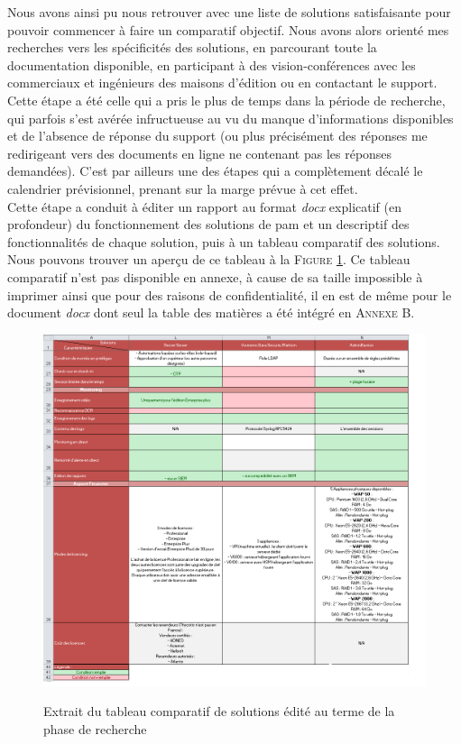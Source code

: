 Nous avons ainsi pu nous retrouver avec une liste de solutions satisfaisante pour pouvoir commencer à faire un comparatif objectif. Nous avons alors orienté mes recherches vers les spécificités des solutions, en parcourant toute la documentation disponible, en participant à des vision-conférences avec les commerciaux et ingénieurs des maisons d'édition ou en contactant le support. Cette étape a été celle qui a pris le plus de temps dans la période de recherche, qui parfois s'est avérée infructueuse au vu du manque d'informations disponibles et de l'absence de réponse du support (ou plus précisément des réponses me redirigeant vers des documents en ligne ne contenant pas les réponses demandées). C'est par ailleurs une des étapes qui a complètement décalé le calendrier prévisionnel, prenant sur la marge prévue à cet effet.\\
Cette étape a conduit à éditer un rapport au format \emph{docx} explicatif (en profondeur) du fonctionnement des solutions de \gls{pam} et un descriptif des fonctionnalités de chaque solution, puis à un tableau comparatif des solutions. Nous pouvons trouver un aperçu de ce tableau à la \textsc{Figure }\ref{fig:tabcomp}. Ce tableau comparatif n'est pas disponible en annexe, à cause de sa taille impossible à imprimer ainsi que pour des raisons de confidentialité, il en est de même pour le document \emph{docx} dont seul la table des matières a été intégré en \textsc{Annexe B}.

\begin{figure}[!ht]
    \center
    \includegraphics[width=\textwidth]{./images/tabcomp.png}
    \label{fig:tabcomp}
    \caption{Extrait du tableau comparatif de solutions édité au terme de la phase de recherche}
\end{figure}

